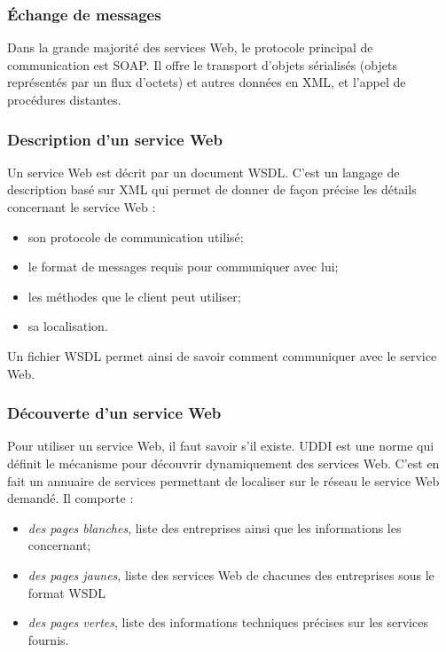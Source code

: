 \subsubsection{\'Echange de messages}

Dans la grande majorit\'e des services Web, le protocole principal de communication est SOAP.
Il offre le transport d'objets s\'erialis\'es (objets repr\'esent\'es par un flux d'octets) et autres donn\'ees en XML, et l'appel de proc\'edures distantes.

\subsubsection{Description d'un service Web}

Un service Web est d\'ecrit par un document WSDL.
C'est un langage de description bas\'e sur XML qui permet de donner de fa\c{c}on pr\'ecise les d\'etails concernant le service Web :

\begin{itemize}
	\item son protocole de communication utilis\'e;
	\item le format de messages requis pour communiquer avec lui;
	\item les m\'ethodes que le client peut utiliser;
	\item sa localisation.

\end{itemize}

\vspace{0.20cm}

\noindent Un fichier WSDL permet ainsi de savoir comment communiquer avec le service Web.

\subsubsection{D\'ecouverte d'un service Web}

Pour utiliser un service Web, il faut savoir s'il existe.
UDDI est une norme qui d\'efinit le m\'ecanisme pour d\'ecouvrir dynamiquement des services Web.
C'est en fait un annuaire de services permettant de localiser sur le r\'eseau le service Web demand\'e.
\noindent Il comporte :

\begin{itemize}
	\item \textit{des pages blanches}, liste des entreprises ainsi que les informations les concernant;
	\item \textit{des pages jaunes}, liste des services Web de chacunes des entreprises sous le format WSDL
	\item \textit{des pages vertes}, liste des informations techniques pr\'ecises sur les services fournis.

\end{itemize}



